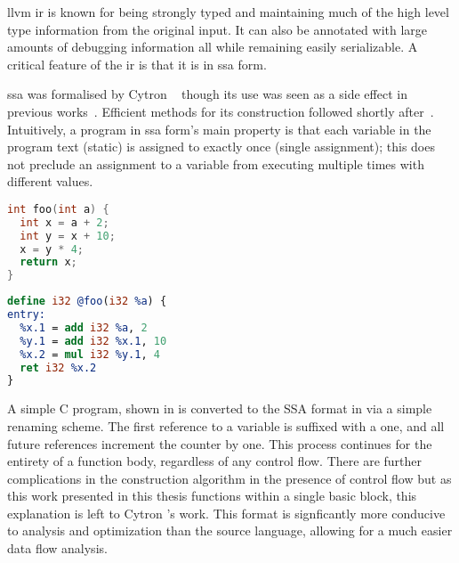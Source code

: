 \documentclass[\main/thesis.tex]{subfiles}
\begin{document}
\Gls{llvm} \gls{ir} is known for being strongly typed and maintaining much of the high level type information from the original input.
It can also be annotated with large amounts of debugging information all while remaining easily serializable.
A critical feature of the \gls{ir} is that it is in \gls{ssa} form.

\Gls{ssa} was formalised by Cytron \etal~\autocite{cytron1989efficient} though its use was seen as a side effect in previous works~\autocite{rosen1988global,alpern1988detecting}.
Efficient methods for its construction followed shortly after~\autocite{cytron1991efficiently,brandis1994single}.
Intuitively, a program in \gls{ssa} form's main property is that each variable in the program text (static) is assigned to exactly once (single assignment); this does not preclude an assignment to a variable from executing multiple times with different values.

\noindent
\begin{minipage}[t]{0.45\linewidth}
\centering
\begin{lstlisting}[caption={[Example C program, pre-SSA conversion.]An simple example C program, pre-conversion to \gls{ssa}.},
      label=lst:cSSA,numbers=none,language=c]
int foo(int a) {
  int x = a + 2;
  int y = x + 10;
  x = y * 4;
  return x;
}
\end{lstlisting}
\end{minipage}
\hspace{.05\linewidth}
\begin{minipage}[t]{0.45\linewidth}
\centering
\begin{lstlisting}[caption={[Example LLVM IR program, post-SSA conversion.]The same simple program, converted to \gls{llvm} \gls{ir} in \gls{ssa} format.},
      label=lst:llSSA,numbers=none,language=llvm]
define i32 @foo(i32 %a) {
entry:
  %x.1 = add i32 %a, 2
  %y.1 = add i32 %x.1, 10
  %x.2 = mul i32 %y.1, 4
  ret i32 %x.2
}
\end{lstlisting}
\end{minipage}

A simple C program, shown in  is converted to the SSA format in  via a simple renaming scheme.
The first reference to a variable is suffixed with a one, and all future references increment the counter by one.
This process continues for the entirety of a function body, regardless of any control flow.
There are further complications in the construction algorithm in the presence of control flow but as this work presented in this thesis functions within a single \gls{basic block}, this explanation is left to Cytron \etal's work.
This format is signficantly more conducive to analysis and optimization than the source language, allowing for a much easier data flow analysis.
\end{document}
